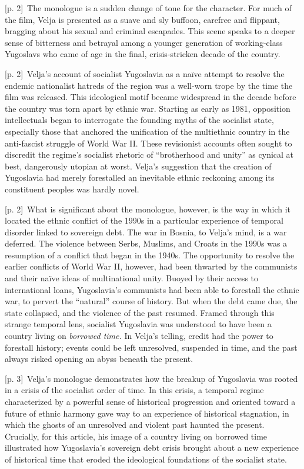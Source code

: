 \documentclass[10pt,a4paper]{article}
\begin{document}
{\scriptsize\color{gray} [p. 2]}\ The monologue is a sudden change of tone for the character. For much of the film, Velja is presented as a suave and sly buffoon, carefree and flippant, bragging about his sexual and criminal escapades. This scene speaks to a deeper sense of bitterness and betrayal among a younger generation of working-class Yugoslavs who came of age in the final, crisis-stricken decade of the country.\par
{\scriptsize\color{gray} [p. 2]}\ Velja’s account of socialist Yugoslavia as a naïve attempt to resolve the endemic nationalist hatreds of the region was a well-worn trope by the time the film was released. This ideological motif became widespread in the decade before the country was torn apart by ethnic war. Starting as early as 1981, opposition intellectuals began to interrogate the founding myths of the socialist state, especially those that anchored the unification of the multiethnic country in the anti-fascist struggle of World War II. These revisionist accounts often sought to discredit the regime’s socialist rhetoric of “brotherhood and unity” as cynical at best, dangerously utopian at worst. Velja’s suggestion that the creation of Yugoslavia had merely forestalled an inevitable ethnic reckoning among its constituent peoples was hardly novel.\par
{\scriptsize\color{gray} [p. 2]}\ What is significant about the monologue, however, is the way in which it located the ethnic conflict of the 1990s in a particular experience of temporal disorder linked to sovereign debt. The war in Bosnia, to Velja’s mind, is a war deferred. The violence between Serbs, Muslims, and Croats in the 1990s was a resumption of a conflict that began in the 1940s. The opportunity to resolve the earlier conflicts of World War II, however, had been thwarted by the communists and their naïve ideas of multinational unity. Buoyed by their access to international loans, Yugoslavia’s communists had been able to forestall the ethnic war, to pervert the “natural” course of history. But when the debt came due, the state collapsed, and the violence of the past resumed. Framed through this strange temporal lens, socialist Yugoslavia was understood to have been a country living on \textit{borrowed time.} In Velja’s telling, credit had the power to forestall history; events could be left unresolved, suspended in time, and the past always risked opening an abyss beneath the present.\par
{\scriptsize\color{gray} [p. 3]}\ Velja’s monologue demonstrates how the breakup of Yugoslavia was rooted in a crisis of the socialist order of time. In this crisis, a temporal regime characterized by a powerful sense of historical progression and oriented toward a future of ethnic harmony gave way to an experience of historical stagnation, in which the ghosts of an unresolved and violent past haunted the present. Crucially, for this article, his image of a country living on borrowed time illustrated how Yugoslavia’s sovereign debt crisis brought about a new experience of historical time that eroded the ideological foundations of the socialist state.\par
\end{document}
